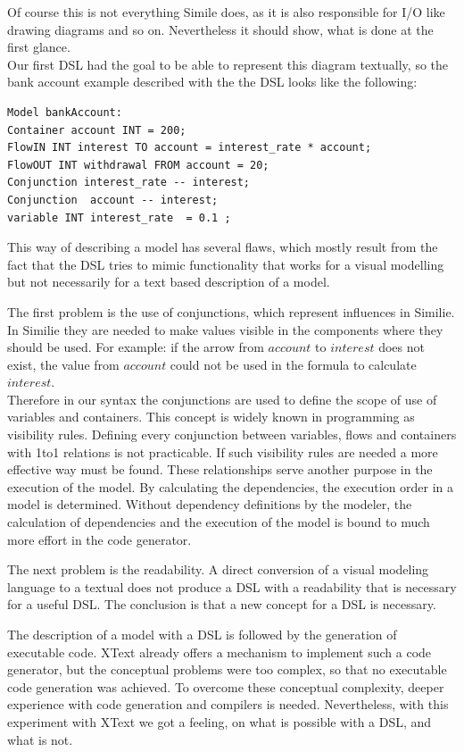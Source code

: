 \par
Of course this is not everything Simile does, as it is also responsible for I/O like drawing diagrams and so on. Nevertheless it should show, what is done at the first glance.\\
Our first DSL had the goal to be able to represent this diagram textually, so the bank account example described with the the DSL looks like the following:
\begin{verbatim}
Model bankAccount:
Container account INT = 200;
FlowIN INT interest TO account = interest_rate * account;
FlowOUT INT withdrawal FROM account = 20;
Conjunction interest_rate -- interest;
Conjunction  account -- interest;
variable INT interest_rate  = 0.1 ;
\end{verbatim}
\par
This way of describing a model has several flaws, which mostly result  from the fact that the DSL tries to mimic functionality that works for a visual modelling but not necessarily for a text based description of a model.
\par
The first problem is the use of conjunctions, which represent influences in Similie. In Similie they are needed to make values visible in the components where they should be used. For example: if the arrow from $account$ to $interest$ does not exist, the value from $account$ could not be used in the formula to calculate $interest$.\\
Therefore in our syntax the conjunctions are used to define the scope of use of variables and containers. This concept is widely known in programming as visibility rules. Defining every conjunction between variables, flows and containers with 1to1 relations is not practicable. If such visibility rules are needed a more effective way must be found.
These relationships serve another purpose in the execution of the model. By calculating the dependencies, the execution order in a model is determined. Without dependency definitions by the modeler, the calculation of dependencies and the execution of the model is bound to much more effort in the code generator.
\par
The next problem is the readability. A direct conversion of a visual modeling language to a textual does not produce a DSL with a readability that is necessary for a useful DSL. The conclusion is that a new concept for a DSL is necessary.
\par
The description of a model with a DSL is followed by the generation of executable code. XText already offers a mechanism to implement such a code generator, but the conceptual problems were too complex, so that no executable code generation was achieved. To overcome these conceptual complexity, deeper experience with code generation and compilers is needed. Nevertheless, with this experiment with XText we got a feeling, on what is possible with a DSL, and what is not. 
